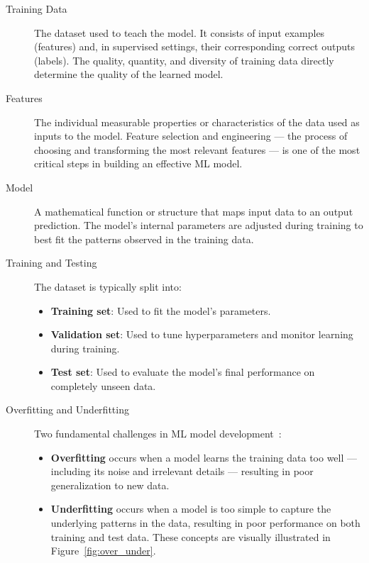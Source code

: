 \begin{description}
    \item[Training Data] The dataset used to teach the model. It consists of input examples (features) and, in supervised settings, their corresponding correct outputs (labels). The quality, quantity, and diversity of training data directly determine the quality of the learned model.
    
    \item[Features] The individual measurable properties or characteristics of the data used as inputs to the model. Feature selection and engineering --- the process of choosing and transforming the most relevant features --- is one of the most critical steps in building an effective ML model.
    
    \item[Model] A mathematical function or structure that maps input data to an output prediction. The model's internal parameters are adjusted during training to best fit the patterns observed in the training data.
    
    \item[Training and Testing] The dataset is typically split into:
    \begin{itemize}
        \item \textbf{Training set}: Used to fit the model's parameters.
        \item \textbf{Validation set}: Used to tune hyperparameters and monitor learning during training.
        \item \textbf{Test set}: Used to evaluate the model's final performance on completely unseen data.
    \end{itemize}
    
    \item[Overfitting and Underfitting] Two fundamental challenges in ML model development~\cite{hastie2009elements}:
    \begin{itemize}
        \item \textbf{Overfitting} occurs when a model learns the training data too well --- including its noise and irrelevant details --- resulting in poor generalization to new data.
        \item \textbf{Underfitting} occurs when a model is too simple to capture the underlying patterns in the data, resulting in poor performance on both training and test data. These concepts are visually illustrated in Figure~\ref{fig:over_under}.
    \end{itemize}


\end{description}

